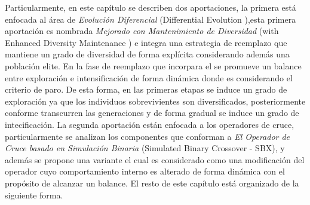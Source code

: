 %
Particularmente, en este capítulo se describen dos aportaciones, la primera está enfocada al área de \textit{Evolución Diferencial} (Differential Evolution \DE{}),esta primera aportación es nombrada \DE{} \textit{Mejorado con Mantenimiento de Diversidad} (\DE with Enhanced Diversity Maintenance \DEEDM{}) e integra una estrategia de reemplazo que mantiene un grado de diversidad de forma explícita considerando además una población elite.
%
En la fase de reemplazo que incorpara el \DEEDM{} se promueve un balance entre exploración e intensificación de forma dinámica donde es considerando el criterio de paro.
%
De esta forma, en las primeras etapas se induce un grado de exploración ya que los individuos sobrevivientes son diversificados, posteriormente conforme transcurren las generaciones y de forma gradual se induce un grado de intecificación.
% 
La segunda aportación están enfocada a los operadores de cruce, particularmente se analizan los componentes que conforman a \textit{El Operador de Cruce basado en Simulación Binaria} (Simulated Binary Crossover - SBX), y además se propone una variante \DSBX{} el cual es considerado como una modificación del operador \SBX{} cuyo comportamiento interno es alterado de forma dinámica con el propósito de alcanzar un balance.
%
El resto de este capítulo está organizado de la siguiente forma.
